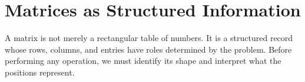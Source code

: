 \section{Matrices as Structured Information}

\begin{corebox}
A matrix is not merely a rectangular table of numbers. It is a structured record
whose rows, columns, and entries have roles determined by the problem. Before
performing any operation, we must identify its shape and interpret what the
positions represent.
\end{corebox}


